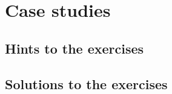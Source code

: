 \documentclass[11pt,openany]{book}
\begin{document}
\part{Case studies}


\appendix
\chapter{Hints to the exercises}
\printhints
\chapter{Solutions to the exercises}
\printsolutions
\printindex
\end{document}
